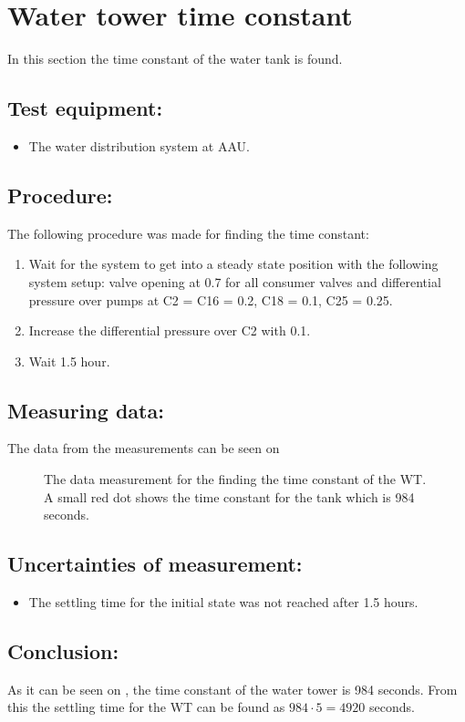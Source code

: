 \section{Water tower time constant}
\label{sec:WT_TimeConstant}

In this section the time constant of the water tank is found.

\subsection*{Test equipment:}
\begin{itemize}
\item The water distribution system at AAU.
\end{itemize}

\subsection*{Procedure:}
The following procedure was made for finding the time constant:
\begin{enumerate}
\item Wait for the system to get into a steady state position with the following system setup: valve opening at 0.7 for all consumer valves and differential pressure over pumps at C2 = C16 = 0.2, C18 = 0.1, C25 = 0.25.
\item Increase the differential pressure over C2 with 0.1.
\item Wait 1.5 hour.
\end{enumerate}


\subsection*{Measuring data:}
The data from the measurements can be seen on 

\begin{figure}

\caption{The data measurement for the finding the time constant of the WT. A small red dot shows the time constant for the tank which is 984 seconds.}
\label{fig:Test_WT_Timeconstant}
\end{figure}

\subsection*{Uncertainties of measurement:}
\begin{itemize}
\item The settling time for the initial state was not reached after 1.5 hours.
\end{itemize}

\subsection*{Conclusion:}
As it can be seen on , the time constant of the water tower is 984 seconds. From this the settling time for the WT can be found as $984\cdot 5 = 4920$ seconds.

